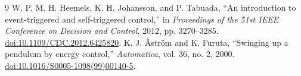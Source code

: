 \documentclass[letterpaper,10pt,conference]{ieeeconf}
\begin{document}
\begin{thebibliography}{9}
W. P. M. H. Heemels, K. H. Johansson, and P. Tabuada,
``An introduction to event-triggered and self-triggered control,''
in \emph{Proceedings of the 51st IEEE Conference on Decision and Control},
2012, pp. 3270--3285. \href{https://doi.org/10.1109/CDC.2012.6425820}{doi:10.1109/CDC.2012.6425820}.
K. J. \AA str\"om and K. Furuta,
``Swinging up a pendulum by energy control,''
\emph{Automatica}, vol. 36, no. 2, 2000.
\href{https://doi.org/10.1016/S0005-1098(99)00140-5}{doi:10.1016/S0005-1098(99)00140-5}.
\end{thebibliography}
\end{document}
